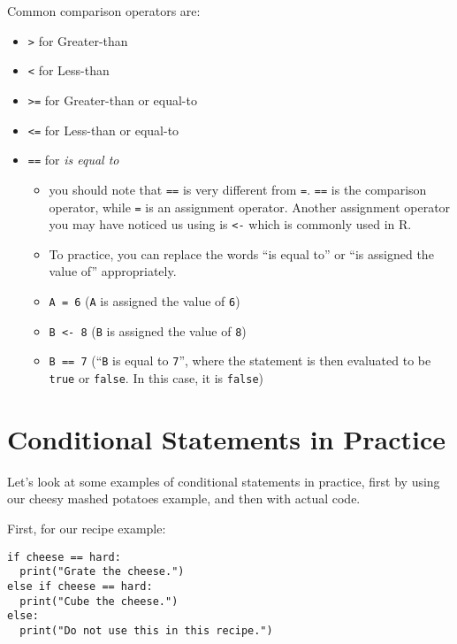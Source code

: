 \documentclass[
]{book}
\providecommand{\tightlist}{%
  \setlength{\itemsep}{0pt}\setlength{\parskip}{0pt}}
\begin{document}
Common comparison operators are:

\begin{itemize}
\tightlist
\item
  \texttt{\textgreater{}} for Greater-than
\item
  \texttt{\textless{}} for Less-than
\item
  \texttt{\textgreater{}=} for Greater-than or equal-to
\item
  \texttt{\textless{}=} for Less-than or equal-to
\item
  \texttt{==} for \emph{is equal to}

  \begin{itemize}
  \tightlist
  \item
    you should note that \texttt{==} is very different from \texttt{=}. \texttt{==} is the comparison operator, while \texttt{=} is an assignment operator. Another assignment operator you may have noticed us using is \texttt{\textless{}-} which is commonly used in R.
  \item
    To practice, you can replace the words ``is equal to'' or ``is assigned the value of'' appropriately.
  \item
    \texttt{A\ =\ 6} (\texttt{A} is assigned the value of \texttt{6})
  \item
    \texttt{B\ \textless{}-\ 8} (\texttt{B} is assigned the value of \texttt{8})
  \item
    \texttt{B\ ==\ 7} (``\texttt{B} is equal to \texttt{7}'', where the statement is then evaluated to be \texttt{true} or \texttt{false}. In this case, it is \texttt{false})
  \end{itemize}
\end{itemize}

\section{Conditional Statements in Practice}\label{conditional-statements-in-practice}

Let's look at some examples of conditional statements in practice, first by using our cheesy mashed potatoes example, and then with actual code.

First, for our recipe example:

\begin{verbatim}
if cheese == hard:
  print("Grate the cheese.")
else if cheese == hard:
  print("Cube the cheese.")
else:
  print("Do not use this in this recipe.")
\end{verbatim}
\end{document}
